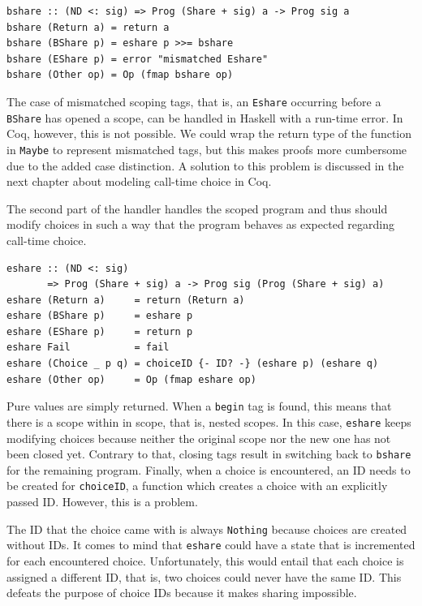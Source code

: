 \documentclass[a4paper, 11pt, fleqn, twoside, abstract=on]{scrreprt}
\newcommand{\hinl}[1]{\texttt{#1}}
\begin{document}
\begin{verbatim}
bshare :: (ND <: sig) => Prog (Share + sig) a -> Prog sig a
bshare (Return a) = return a
bshare (BShare p) = eshare p >>= bshare
bshare (EShare p) = error "mismatched Eshare"
bshare (Other op) = Op (fmap bshare op)
\end{verbatim}

The case of mismatched scoping tags, that is, an \hinl{Eshare} occurring before a \hinl{BShare} has opened a scope, can be handled in Haskell with a run-time error.
In Coq, however, this is not possible.
We could wrap the return type of the function in \hinl{Maybe} to represent mismatched tags, but this makes proofs more cumbersome due to the added case distinction.
A solution to this problem is discussed in the next chapter about modeling call-time choice in Coq.

The second part of the handler handles the scoped program and thus should modify choices in such a way that the program behaves as expected regarding call-time choice.

\begin{verbatim}
eshare :: (ND <: sig)
       => Prog (Share + sig) a -> Prog sig (Prog (Share + sig) a)
eshare (Return a)     = return (Return a)
eshare (BShare p)     = eshare p
eshare (EShare p)     = return p
eshare Fail           = fail
eshare (Choice _ p q) = choiceID {- ID? -} (eshare p) (eshare q)
eshare (Other op)     = Op (fmap eshare op)
\end{verbatim}

Pure values are simply returned.
When a \hinl{begin} tag is found, this means that there is a scope within in scope, that is, nested scopes.
In this case, \hinl{eshare} keeps modifying choices because neither the original scope nor the new one has not been closed yet.
Contrary to that, closing tags result in switching back to \hinl{bshare} for the remaining program.
Finally, when a choice is encountered, an ID needs to be created for  \hinl{choiceID}, a function which creates a choice with an explicitly passed ID.
However, this is a problem.

The ID that the choice came with is always \hinl{Nothing} because choices are created without IDs.
It comes to mind that \hinl{eshare} could have a state that is incremented for each encountered choice.
Unfortunately, this would entail that each choice is assigned a different ID, that is, two choices could never have the same ID.
This defeats the purpose of choice IDs because it makes sharing impossible.
\end{document}
